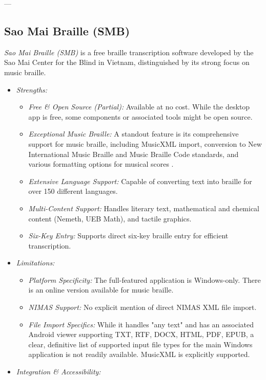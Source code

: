 ---

\subsection{Sao Mai Braille (SMB)}
\emph{Sao Mai Braille (SMB)} is a free braille transcription software developed by the Sao Mai Center for the Blind in Vietnam, distinguished by its strong focus on music braille.

\begin{itemize}
    \item \emph{Strengths:}
    \begin{itemize}
        \item \emph{Free \& Open Source (Partial):} Available at no cost. While the desktop app is free, some components or associated tools might be open source.
        \item \emph{Exceptional Music Braille:} A standout feature is its comprehensive support for music braille, including MusicXML import, conversion to New International Music Braille and Music Braille Code standards, and various formatting options for musical scores \cite{SaoMaiBraille}.
        \item \emph{Extensive Language Support:} Capable of converting text into braille for over 150 different languages.
        \item \emph{Multi-Content Support:} Handles literary text, mathematical and chemical content (Nemeth, UEB Math), and tactile graphics.
        \item \emph{Six-Key Entry:} Supports direct six-key braille entry for efficient transcription.
    \end{itemize}
    \item \emph{Limitations:}
    \begin{itemize}
        \item \emph{Platform Specificity:} The full-featured application is Windows-only. There is an online version available for music braille.
        \item \emph{NIMAS Support:} No explicit mention of direct NIMAS XML file import.
        \item \emph{File Import Specifics:} While it handles "any text" and has an associated Android viewer supporting TXT, RTF, DOCX, HTML, PDF, EPUB, a clear, definitive list of supported input file types for the main Windows application is not readily available. MusicXML is explicitly supported.
    \end{itemize}
    \item \emph{Integration \& Accessibility:}

\end{itemize}
